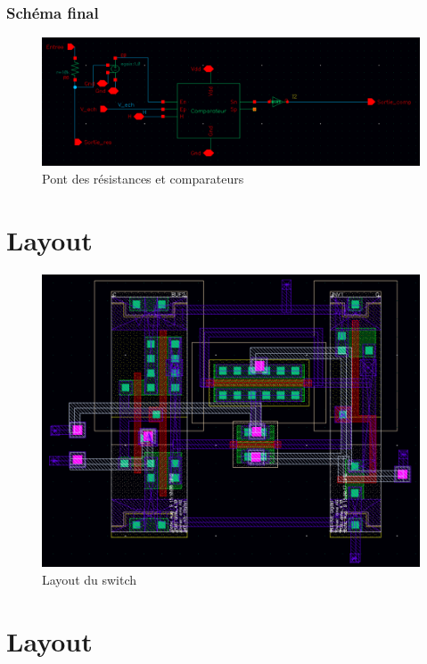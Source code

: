 \documentclass{beamer}
\begin{document}
\begin{frame}
\frametitle{Sch\'ema final}

\begin{figure}[!htb]
  \includegraphics[width=\linewidth]{res_comp.png}
  \caption{Pont des r\'esistances et comparateurs}
\end{figure}

\end{frame}


\section{Layout}

\begin{frame}

\begin{figure}[!htb]
  \includegraphics[width=0.8\linewidth]{layout_.png}
  \caption{Layout du switch}
\end{figure}

\end{frame}


\section{Layout}
\end{document}

